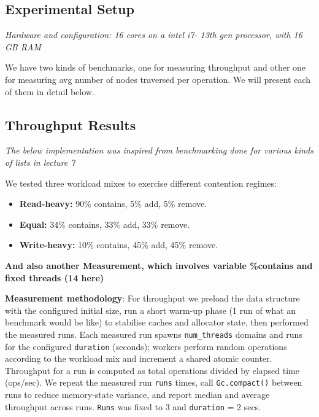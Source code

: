 \documentclass[11pt,a4paper]{article}
\begin{document}
\subsection{Experimental Setup}

\textit{Hardware and configuration: 16 cores on a intel i7- 13th gen processor, with 16 GB RAM}

We have two kinds of benchmarks, one for measuring throughput and other one for measuring avg number of nodes traversed per operation. We will present each of them in detail below.

\subsection{Throughput Results}
\textit{The below implementation was inspired from benchmarking done for various kinds of lists in lecture 7}

We tested three workload mixes to exercise different contention regimes:
\begin{itemize}
  \item \textbf{Read-heavy:} 90\% contains, 5\% add, 5\% remove.
  \item \textbf{Equal:} 34\% contains, 33\% add, 33\% remove.
  \item \textbf{Write-heavy:} 10\% contains, 45\% add, 45\% remove.
\end{itemize}
\textbf{And also another Measurement, which involves variable \%contains and fixed threads (14 here)}
\newline
\vspace{1cm}

\textbf{Measurement methodology}: For throughput we preload the data structure with the configured initial size, run a short warm-up phase (1 run of what an benchmark would be like) to stabilise caches and allocator state, then performed the measured runs. Each measured run spawns \texttt{num\_threads} domains and runs for the configured \texttt{duration} (seconds); workers perform random operations according to the workload mix and increment a shared atomic counter. Throughput for a run is computed as total operations divided by elapsed time (ops/sec). We repeat the measured run \texttt{runs} times, call \texttt{Gc.compact()} between runs to reduce memory-state variance, and report median and average throughput across runs. \texttt{Runs} was fixed to 3 and \texttt{duration} = 2 secs.
\end{document}
